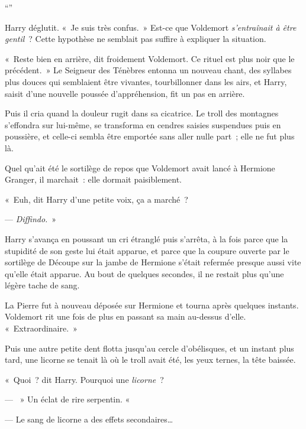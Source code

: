 “”

Harry déglutit.
«~Je suis très confus.~»
Est-ce que Voldemort \emph{s'entraînait à être gentil}~?
Cette hypothèse ne semblait pas suffire à expliquer la situation.

«~Reste bien en arrière, dit froidement Voldemort.
Ce rituel est plus noir que le précédent.~»
Le Seigneur des Ténèbres entonna un nouveau chant, des syllabes plus douces qui semblaient être vivantes, tourbillonner dans les airs, et Harry, saisit d'une nouvelle poussée d'appréhension, fit un pas en arrière.

Puis il cria quand la douleur rugit dans sa cicatrice.
Le troll des montagnes s'effondra sur lui-même, se transforma en cendres saisies suspendues puis en poussière, et celle-ci sembla être emportée sans aller nulle part~; elle ne fut plus là.

Quel qu'ait été le sortilège de repos que Voldemort avait lancé à Hermione Granger, il marchait~: elle dormait paisiblement.

«~Euh, dit Harry d'une petite voix, ça a marché~?

--- \emph{Diffindo.}~»

Harry s'avança en poussant un cri étranglé puis s'arrêta, à la fois parce que la stupidité de son geste lui était apparue, et parce que la coupure ouverte par le sortilège de Découpe sur la jambe de Hermione s'était refermée presque aussi vite qu'elle était apparue.
Au bout de quelques secondes, il ne restait plus qu'une légère tache de sang.

La Pierre fut à nouveau déposée sur Hermione et tourna après quelques instants.
Voldemort rit une fois de plus en passant sa main au-dessus d'elle.
«~Extraordinaire.~»

Puis une autre petite dent flotta jusqu'au cercle d'obélisques, et un instant plus tard, une licorne se tenait là où le troll avait été, les yeux ternes, la tête baissée.

«~Quoi~? dit Harry.
Pourquoi une \emph{licorne}~?

--- ~» Un éclat de rire serpentin.
«~

--- Le sang de licorne a des effets secondaires…

